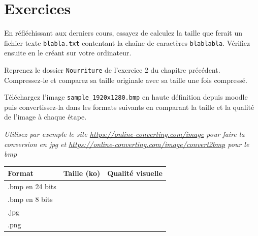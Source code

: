 \documentclass[11pt, a4paper]{book}
\begin{document}
\section{Exercices}

\begin{exercice}
En réfléchissant aux derniers cours, essayez de calculez la taille que ferait un fichier texte \texttt{blabla.txt} contentant la chaîne de caractères \texttt{blablabla}.
Vérifiez ensuite en le créant sur votre ordinateur.
\end{exercice}


\begin{exercice}
Reprenez le dossier \texttt{Nourriture} de l'exercice 2 du chapitre précédent. Compressez-le et comparez sa taille originale avec sa taille une fois compressé.
\end{exercice}

\begin{exercice}
Téléchargez l'image \texttt{sample\_1920x1280.bmp} en haute définition depuis moodle puis convertissez-la dans les formats suivants en comparant la taille et la qualité de l'image à chaque étape. 

\textit{Utilisez par exemple le site \url{https://online-converting.com/image} pour faire la conversion en jpg et \url{https://online-converting.com/image/convert2bmp} pour le bmp}
\begin{center}
   \begin{tabular}{| l || c | r | }
     \hline
     Format & Taille (ko) & Qualité visuelle \\ \hline
     .bmp en 24 bits &  &  \\ \hline
     .bmp en 8 bits &  &  \\ \hline
     .jpg &  &  \\ \hline
     .png &  &  \\
     \hline
   \end{tabular}
\end{center}
\end{exercice}
\end{document}
